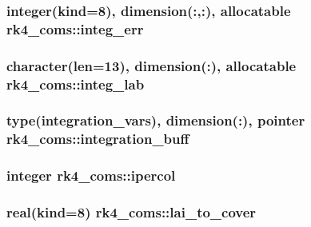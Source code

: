 \subsubsection[{\texorpdfstring{integ\+\_\+err}{integ_err}}]{\setlength{\rightskip}{0pt plus 5cm}integer(kind=8), dimension(\+:,\+:), allocatable rk4\+\_\+coms\+::integ\+\_\+err}\hypertarget{namespacerk4__coms_aecab6dfff0aaea0938b5c59d550860bc}{}\label{namespacerk4__coms_aecab6dfff0aaea0938b5c59d550860bc}
\subsubsection[{\texorpdfstring{integ\+\_\+lab}{integ_lab}}]{\setlength{\rightskip}{0pt plus 5cm}character(len=13), dimension(\+:), allocatable rk4\+\_\+coms\+::integ\+\_\+lab}\hypertarget{namespacerk4__coms_a4f5c8dc79c821a459a356f283b4831c8}{}\label{namespacerk4__coms_a4f5c8dc79c821a459a356f283b4831c8}
\subsubsection[{\texorpdfstring{integration\+\_\+buff}{integration_buff}}]{\setlength{\rightskip}{0pt plus 5cm}type({\bf integration\+\_\+vars}), dimension(\+:), pointer rk4\+\_\+coms\+::integration\+\_\+buff}\hypertarget{namespacerk4__coms_a3c62cf3b7294822d789a72c33ed42538}{}\label{namespacerk4__coms_a3c62cf3b7294822d789a72c33ed42538}
\subsubsection[{\texorpdfstring{ipercol}{ipercol}}]{\setlength{\rightskip}{0pt plus 5cm}integer rk4\+\_\+coms\+::ipercol}\hypertarget{namespacerk4__coms_a49c5428026d0aece9bcf4f9a87c7b823}{}\label{namespacerk4__coms_a49c5428026d0aece9bcf4f9a87c7b823}
\subsubsection[{\texorpdfstring{lai\+\_\+to\+\_\+cover}{lai_to_cover}}]{\setlength{\rightskip}{0pt plus 5cm}real(kind=8) rk4\+\_\+coms\+::lai\+\_\+to\+\_\+cover}\hypertarget{namespacerk4__coms_a5af034bb3daf3fd270550fe26a843ced}{}\label{namespacerk4__coms_a5af034bb3daf3fd270550fe26a843ced}
